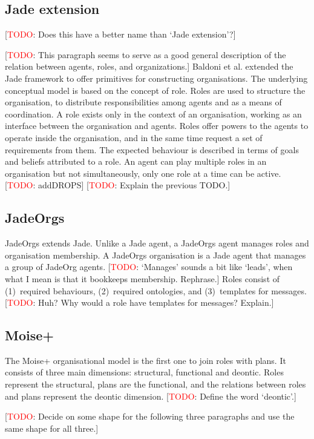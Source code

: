 \documentclass{article}
\newcommand{\todo}[1]{[\textcolor{red}{TODO}: #1]}
\begin{document}
\subsection{Jade extension}

\todo{Does this have a better name than `Jade extension'?}

\todo{This paragraph seems to serve as a good general description
of the relation between agents, roles, and organizations.}
Baldoni et al. extended the Jade framework to offer primitives
for constructing organisations. The underlying conceptual model
is based on the concept of role. Roles are used to structure the
organisation, to distribute responsibilities among agents and as
a means of coordination. A role exists only in the context of an
organisation, working as an interface between the organisation and
agents. Roles offer powers to the agents to operate inside the
organisation, and in the same time request a set of requirements
from them. The expected behaviour is described in terms of goals and
beliefs attributed to a role. An agent can play multiple roles in an
organisation but not simultaneously, only one role at a time can be
active. \todo{addDROPS} \todo{Explain the previous TODO.}

\subsection{JadeOrgs}

JadeOrgs extends Jade. Unlike a Jade agent, a JadeOrgs
agent manages roles and organisation membership. A JadeOrgs
organisation is a Jade agent that manages a group of JadeOrg
agents. \todo{`Manages' sounds a bit like `leads', when what I
mean is that it bookkeeps membership. Rephrase.} Roles consist
of (1)~required behaviours, (2)~required ontologies, and
(3)~templates for messages. \todo{Huh? Why would a role have
templates for messages? Explain.}

\subsection{Moise+} 

The Moise+ organisational model is the first one to join roles
with plans. It consists of three main dimensions: structural,
functional and deontic. Roles represent the structural, plans
are the functional, and the relations between roles and
plans represent the deontic dimension. \todo{Define the word
`deontic'.}

\todo{Decide on some shape for the following three paragraphs
and use the same shape for all three.}
\end{document}
